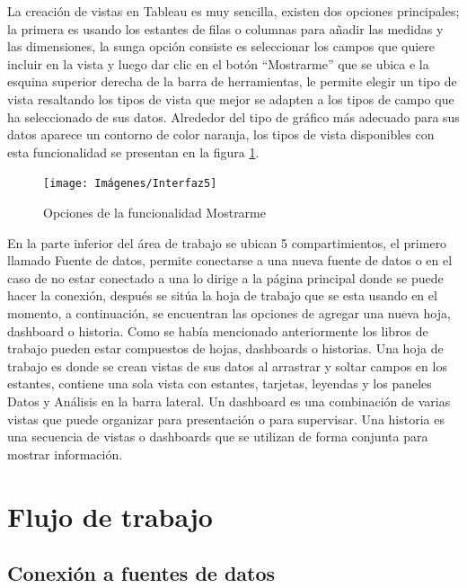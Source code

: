 \documentclass[
]{book}
\begin{document}
La creación de vistas en Tableau es muy sencilla, existen dos opciones principales; la primera es usando los estantes de filas o columnas para añadir las medidas y las dimensiones, la sunga opción consiste es seleccionar los campos que quiere incluir en la vista y luego dar clic en el botón ``Mostrarme'' que se ubica e la esquina superior derecha de la barra de herramientas, le permite elegir un tipo de vista resaltando los tipos de vista que mejor se adapten a los tipos de campo que ha seleccionado de sus datos. Alrededor del tipo de gráfico más adecuado para sus datos aparece un contorno de color naranja, los tipos de vista disponibles con esta funcionalidad se presentan en la figura \ref{fig:mostrarme-fig}.

\begin{figure}

{\centering \texttt{[image: Imágenes/Interfaz5]} 

}

\caption{Opciones de la funcionalidad Mostrarme}\label{fig:mostrarme-fig}
\end{figure}

En la parte inferior del área de trabajo se ubican 5 compartimientos, el primero llamado Fuente de datos, permite conectarse a una nueva fuente de datos o en el caso de no estar conectado a una lo dirige a la página principal donde se puede hacer la conexión, después se sitúa la hoja de trabajo que se esta usando en el momento, a continuación, se encuentran las opciones de agregar una nueva hoja, dashboard o historia. Como se había mencionado anteriormente los libros de trabajo pueden estar compuestos de hojas, dashboards o historias. Una hoja de trabajo es donde se crean vistas de sus datos al arrastrar y soltar campos en los estantes, contiene una sola vista con estantes, tarjetas, leyendas y los paneles Datos y Análisis en la barra lateral. Un dashboard es una combinación de varias vistas que puede organizar para presentación o para supervisar. Una historia es una secuencia de vistas o dashboards que se utilizan de forma conjunta para mostrar información.

\hypertarget{flujo-de-trabajo}{%
\section{Flujo de trabajo}\label{flujo-de-trabajo}}

\hypertarget{conexiuxf3n-a-fuentes-de-datos}{%
\subsection{Conexión a fuentes de datos}\label{conexiuxf3n-a-fuentes-de-datos}}
\end{document}
